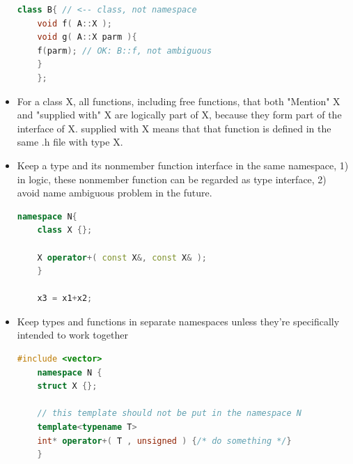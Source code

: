 \documentclass[a4paper,12pt,twoside]{book}
\begin{document}
\begin{itemize}
\begin{lstlisting}[frame=single, language=c++]
	class B{ // <-- class, not namespace
	void f( A::X );
	void g( A::X parm ){
	f(parm); // OK: B::f, not ambiguous
	}
	};
	\end{lstlisting}
	
	\item For a class X, all functions, including free functions, that both "Mention" X
	and "supplied with" X are logically part of X, because they form part of the interface of X. supplied with X means that that function is defined in the same .h file with type X. 
	
	\item Keep a type and its nonmember function interface in the same namespace, 1) in logic, these nonmember function can be regarded as type interface, 2) avoid name ambiguous problem in the future.
	\begin{lstlisting}[frame=single, language=c++]
	namespace N{
	class X {};
	
	X operator+( const X&, const X& );
	}
	
	x3 = x1+x2;
	\end{lstlisting}
	
	\item Keep types and functions in separate namespaces unless they're specifically intended to work together
	
	\begin{lstlisting}[frame=single, language=c++]
	#include <vector>
	namespace N {
	struct X {};
	
	// this template should not be put in the namespace N
	template<typename T>
	int* operator+( T , unsigned ) {/* do something */}
	}
	\end{lstlisting}
	
\end{itemize}
\end{document}

